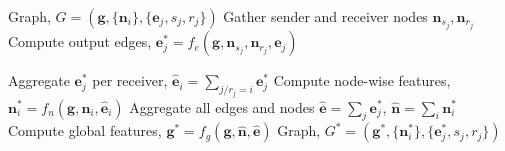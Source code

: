 \begin{algorithm}[t!]
\caption{Graph network, GN}
  \label{alg:graph_network}
\begin{algorithmic}
     Graph, $G = (\textbf{g}, \{\textbf{n}_i\}, \{\textbf{e}_j, s_j, r_j\})$ 
  \STATE Gather sender and receiver nodes $\textbf{n}_{s_j}, \textbf{n}_{r_j}$
  \STATE Compute output edges, 
  $\textbf{e}^*_j = f_{e}(\textbf{g}, \textbf{n}_{s_j}, \textbf{n}_{r_j}, \textbf{e}_j)$
  \ENDFOR
     
     \STATE Aggregate $\textbf{e}^*_j$ per receiver, $\hat{\textbf{e}}_{i} = \sum_{j / r_j=i} \textbf{e}^*_j$
     \STATE Compute node-wise features,
  $\textbf{n}^*_i =  f_{n}(\textbf{g}, \textbf{n}_i, \hat{\textbf{e}}_{i})$
  \ENDFOR
  \STATE Aggregate all edges and nodes $\hat{\textbf{e}} = \sum_{j} \textbf{e}^*_j$, $\hat{\textbf{n}} = \sum_{i} \textbf{n}^*_i$
  \STATE Compute global features,
  $\textbf{g}^* =  f_{g}(\textbf{g}, \hat{\textbf{n}}, \hat{\textbf{e}})$
   Graph, $G^* = (\textbf{g}^*, \{\textbf{n}^*_i\}, \{\textbf{e}^*_j, s_j, r_j\})$ 
\end{algorithmic}
\end{algorithm}